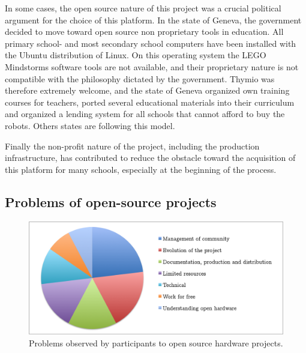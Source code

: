 \documentclass[letterpaper, 10 pt, conference]{ieeeconf}  %
\begin{document}
In some cases, the open source nature of this project was a crucial political argument for the choice of this platform.
In the state of Geneva, the government decided to move toward open source non proprietary tools in education.
All primary school- and most secondary school computers have been installed with the Ubuntu distribution of Linux. 
On this operating system the LEGO Mindstorms software tools are not available, and their proprietary nature is not compatible with the philosophy dictated by the government. 
Thymio was therefore extremely welcome, and the state of Geneva organized own training courses for teachers, ported several educational materials into their curriculum and organized a lending system for all schools that cannot afford to buy the robots.
Others states are following this model.

Finally the non-profit nature of the project, including the production infrastructure, has contributed to reduce the obstacle toward the acquisition of this platform for many schools, especially at the beginning of the process.

\subsection{Problems of open-source projects}

\begin{figure}
\centering
\includegraphics[width=\columnwidth]{figures/problems}
\caption{Problems observed by participants to open source hardware projects.}
\label{fig:problems}
\end{figure}
\end{document}
